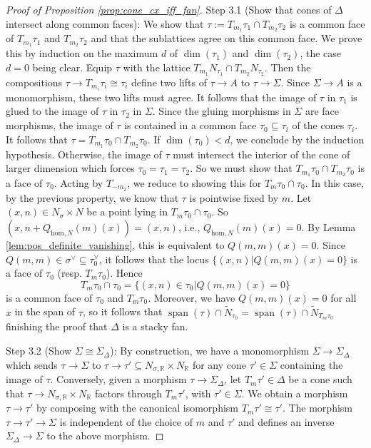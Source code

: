 \documentclass[11pt]{amsart}
\theoremstyle{definition}
\theoremstyle{remark}
\DeclareMathOperator{\Span}{span}
\def\hom{\mathrm{hom}}
\begin{document}
\begin{proof}[Proof of Proposition \ref{prop:cone_cx_iff_fan}]
	Step 3.1 (Show that cones of $\Delta$ intersect along common faces): We show that $\tau:=T_{m_1}\tau_1\cap T_{m_2}\tau_2$ is a common face of $T_{m_1}\tau_1$
	and $T_{m_2}\tau_2$ and that the sublattices agree on this common face. We prove this by induction on the maximum $d$ of $\dim(\tau_1)$
	and $\dim(\tau_2)$, the case $d=0$ being clear. Equip $\tau$ with the lattice $T_{m_1}N_{\tau_1}\cap T_{m_2}N_{\tau_2}$.
	Then the compositions $\tau\to T_{m_{i}}\tau_{i}\cong \tau_i$ define two lifts of $\tau\to A$ to $\tau\to \Sigma$. Since $\Sigma\to A$
	is a monomorphism, these two lifts must agree. It follows that the image of $\tau$ in $\tau_1$ is glued to the image of $\tau$ in $\tau_2$
	in $\Sigma$. Since the gluing morphisms in $\Sigma$ are face morphisms, the image of $\tau$ is contained in a common face
	$\tau_0\subseteq \tau_i$ of the cones $\tau_i$. It follows that $\tau=T_{m_1}\tau_0\cap T_{m_2}\tau_0$. If $\dim(\tau_0)<d$, we conclude
	by the induction hypothesis. Otherwise, the image of $\tau$ must intersect the interior of the cone of larger dimension which forces
	$\tau_0=\tau_1=\tau_2$. So we must show that $T_{m_1}\tau_0\cap T_{m_2}\tau_0$ is a face of $\tau_0$. Acting by $T_{-m_2}$,
	we reduce to showing this for $T_{m}\tau_0\cap \tau_0$. In this case, by the previous property, we know that $\tau$ is pointwise
	fixed by $m$. Let $(x,n)\in N_{\sigma}\times N$ be a point lying in $T_m\tau_0\cap \tau_0$.
	So $(x,n+Q_{\hom,N}(m)(x))=(x,n)$, i.e., $Q_{\hom,N}(m)(x)=0$. By Lemma \ref{lem:pos_definite_vanishing}, this is equivalent
	to $Q(m,m)(x)=0$. Since $Q(m,m)\in \sigma^{\vee}\subseteq \tau_0^{\vee}$, it follows that the locus $\{(x,n)|Q(m,m)(x)=0\}$
	is a face of $\tau_0$ (resp. $T_{m}\tau_0$). Hence
	$$T_m\tau_0\cap \tau_0=\{(x,n)\in \tau_0|Q(m,m)(x)=0\}$$
	is a common face
	of $\tau_0$ and $T_m\tau_0$. Moreover, we have $Q(m,m)(x)=0$ for all $x$ in the span of $\tau$, so it follows that
	$\Span(\tau)\cap \tilde{N}_{\tau_0}=\Span(\tau)\cap \tilde{N}_{T_m \tau_0}$ finishing the proof that $\Delta$ is a stacky fan.

	Step 3.2 (Show $\Sigma\cong \Sigma_{\Delta}$): By construction, we have a monomorphism $\Sigma\to \Sigma_{\Delta}$
	which sends $\tau\to \Sigma$ to $\tau\to \tau'\subseteq N_{\sigma,\mathbb{R}}\times N_{\mathbb{R}}$ for any cone $\tau'\in \Sigma$ containing the
	image of $\tau$. Conversely, given a morphism $\tau\to \Sigma_{\Delta}$, let $T_m\tau'\in \Delta$ be a cone such
	that $\tau\to N_{\sigma,\mathbb{R}}\times N_{\mathbb{R}}$ factors through $T_m\tau'$, with $\tau'\in \Sigma$. We obtain a morphism $\tau\to \tau'$
	by composing with the canonical isomorphism $T_m\tau'\cong \tau'$. The morphism $\tau\to \tau'\to \Sigma$ is independent of the
	choice of $m$ and $\tau'$ and defines an inverse $\Sigma_{\Delta}\to \Sigma$ to the above morphism.
\end{proof}
\end{document}
